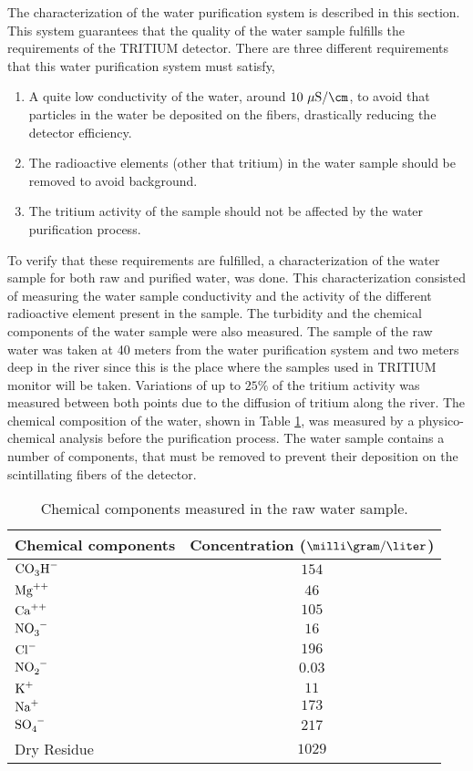 The characterization of the water purification system is described in this section. This system guarantees that the quality of the water sample fulfills the requirements of the TRITIUM detector. There are three different requirements that this water purification system must satisfy,

\begin{enumerate}
\item{} A quite low conductivity of the water, around $10~\mu\text{S}/\cm$, to avoid that particles in the water be deposited on the fibers, drastically reducing the detector efficiency.

\item{} The radioactive elements (other that tritium) in the water sample should be removed to avoid background.

\item{} The tritium activity of the sample should not be affected by the water purification process. 

\end{enumerate}

To verify that these requirements are fulfilled, a characterization of the water sample for both raw and purified water, was done. This characterization consisted of measuring the water sample conductivity and the activity of the different radioactive element present in the sample. The turbidity and the chemical components of the water sample were also measured. The sample of the raw water was taken at 40 meters from the water purification system and two meters deep in the river since this is the place where the samples used in TRITIUM monitor will be taken. Variations of up to $25\%$ of the tritium activity was measured between both points due to the diffusion of tritium along the river. The chemical composition of the water, shown in Table \ref{tab:ChemicalComponentsRawWater}, was measured by a physico-chemical analysis before the purification process. The water sample contains a number of components, that must be removed to prevent their deposition on the scintillating fibers of the detector.


\begin{table}[htbp]
\centering{}%
\begin{tabular}{lc}
\toprule 
Chemical components & Concentration ($\milli\gram/\liter$) \tabularnewline
\midrule
\midrule 
$\ce{CO_{3}H^-}$ & $154$ \tabularnewline
$\ce{Mg^{++}}$ & $46$ \tabularnewline
$\ce{Ca^{++}}$ & $105$ \tabularnewline
$\ce{NO_{3}^-}$ & $16$ \tabularnewline
$\ce{Cl^-}$ & $196$ \tabularnewline
$\ce{NO_{2}^-}$ & $0.03$ \tabularnewline
$\ce{K^{+}}$ & $11$ \tabularnewline
$\ce{Na^{+}}$ & $173$ \tabularnewline
$\ce{SO_{4}^-}$ & $217$ \tabularnewline
Dry Residue & $1029$ \tabularnewline
\bottomrule
\end{tabular}
\caption{Chemical components measured in the raw water sample.}
\label{tab:ChemicalComponentsRawWater}
\end{table}

